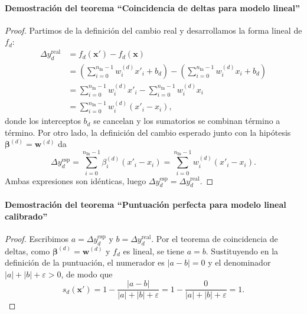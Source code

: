 \documentclass[12pt]{report} %
\begin{document}
\paragraph*{Demostración del teorema ``Coincidencia de deltas para modelo lineal''}
\begin{proof}
    Partimos de la definición del cambio real y desarrollamos la forma lineal de $f_d$:
    \begin{align*}
        \Delta y_d^{\text{real}}
         & = f_d(\mathbf{x}') - f_d(\mathbf{x})                                                                                             \\
         & = \left(\sum_{i=0}^{n_{\text{In}}-1} w_i^{(d)} x'_i + b_d\right) - \left(\sum_{i=0}^{n_{\text{In}}-1} w_i^{(d)} x_i + b_d\right) \\
         & = \sum_{i=0}^{n_{\text{In}}-1} w_i^{(d)} x'_i - \sum_{i=0}^{n_{\text{In}}-1} w_i^{(d)} x_i                                       \\
         & = \sum_{i=0}^{n_{\text{In}}-1} w_i^{(d)} (x'_i - x_i),
    \end{align*}
    donde los interceptos $b_d$ se cancelan y los sumatorios se combinan término a término. Por otro lado, la definición del cambio esperado junto con la hipótesis $\boldsymbol{\beta}^{(d)} = \mathbf{w}^{(d)}$ da
    $$\Delta y_d^{\text{esp}} = \sum_{i=0}^{n_{\text{In}}-1} \beta_i^{(d)} (x'_i - x_i) = \sum_{i=0}^{n_{\text{In}}-1} w_i^{(d)} (x'_i - x_i).$$
    Ambas expresiones son idénticas, luego $\Delta y_d^{\text{esp}} = \Delta y_d^{\text{real}}$.
\end{proof}

\paragraph*{Demostración del teorema ``Puntuación perfecta para modelo lineal calibrado''}
\begin{proof}
    Escribimos $a = \Delta y_d^{\text{esp}}$ y $b = \Delta y_d^{\text{real}}$. Por el teorema de coincidencia de deltas, como $\boldsymbol{\beta}^{(d)} = \mathbf{w}^{(d)}$ y $f_d$ es lineal, se tiene $a = b$. Sustituyendo en la definición de la puntuación, el numerador es $|a - b| = 0$ y el denominador $|a| + |b| + \varepsilon > 0$, de modo que
    $$s_d(\mathbf{x}') = 1 - \frac{|a - b|}{|a| + |b| + \varepsilon} = 1 - \frac{0}{|a| + |b| + \varepsilon} = 1.$$
\end{proof}
\end{document}
